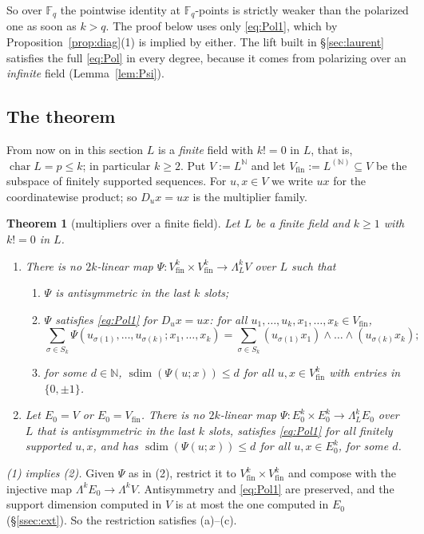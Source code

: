 \documentclass[11pt]{amsart}
\newtheorem{theorem}{Theorem}
\theoremstyle{definition}
\theoremstyle{remark}
\numberwithin{equation}{section}
\newcommand{\N}{\mathbb{N}}
\newcommand{\F}{\mathbb{F}}
\newcommand{\sdim}{\operatorname{sdim}}
\begin{document}
So over $\F_q$ the pointwise identity at $\F_q$\nobreakdash-points is strictly weaker than the polarized one as soon as $k>q$. The
proof below uses only \eqref{eq:Pol1}, which by Proposition~\ref{prop:diag}(1) is implied by either. The lift built in
\S\ref{sec:laurent} satisfies the full \eqref{eq:Pol} in every degree, because it comes from polarizing over an \emph{infinite}
field (Lemma~\ref{lem:Psi}).

\subsection{The theorem}
From now on in this section $L$ is a \emph{finite} field with $k!=0$ in $L$, that is, $\operatorname{char}L=p\le k$; in
particular $k\ge2$. Put $V:=L^\N$ and let $V_{\mathrm{fin}}:=L^{(\N)}\subseteq V$ be the subspace of finitely supported
sequences. For $u,x\in V$ we write $ux$ for the coordinatewise product; so $D_ux=ux$ is the multiplier family.

\begin{theorem}[multipliers over a finite field]\label{thm:FF}
Let $L$ be a finite field and $k\ge1$ with $k!=0$ in $L$.
\begin{enumerate}
\item There is no $2k$\nobreakdash-linear map $\Psi\colon V_{\mathrm{fin}}^k\times V_{\mathrm{fin}}^k\to\Lambda^k_LV$ over $L$ such that
\begin{enumerate}
\item $\Psi$ is antisymmetric in the last $k$ slots;
\item $\Psi$ satisfies \eqref{eq:Pol1} for $D_ux=ux$: for all $u_1,\dots,u_k,x_1,\dots,x_k\in V_{\mathrm{fin}}$,
\[
\sum_{\sigma\in S_k}\Psi(u_{\sigma(1)},\dots,u_{\sigma(k)};x_1,\dots,x_k)=\sum_{\sigma\in S_k}(u_{\sigma(1)}x_1)\wedge\dots\wedge(u_{\sigma(k)}x_k);
\]
\item for some $d\in\N$, $\sdim(\Psi(u;x))\le d$ for all $u,x\in V_{\mathrm{fin}}^k$ with entries in $\{0,\pm1\}$.
\end{enumerate}
\item Let $E_0=V$ or $E_0=V_{\mathrm{fin}}$. There is no $2k$\nobreakdash-linear map $\Psi\colon E_0^k\times E_0^k\to\Lambda^k_LE_0$ over $L$
that is antisymmetric in the last $k$ slots, satisfies \eqref{eq:Pol1} for all finitely supported $u,x$, and has
$\sdim(\Psi(u;x))\le d$ for all $u,x\in E_0^k$, for some $d$.
\end{enumerate}
\end{theorem}

\emph{(1) implies (2).} Given $\Psi$ as in (2), restrict it to $V_{\mathrm{fin}}^k\times V_{\mathrm{fin}}^k$ and compose with the
injective map $\Lambda^kE_0\to\Lambda^kV$. Antisymmetry and \eqref{eq:Pol1} are preserved, and the support dimension computed
in $V$ is at most the one computed in $E_0$ (\S\ref{ssec:ext}). So the restriction satisfies (a)--(c).
\end{document}
